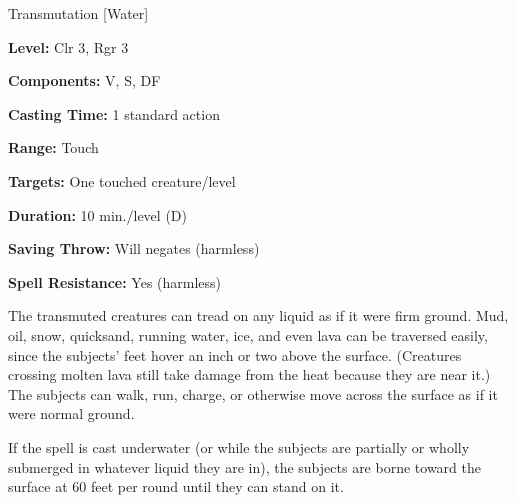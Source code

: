 
Transmutation [Water]

\textbf{Level:} Clr 3, Rgr 3

\textbf{Components:} V, S, DF

\textbf{Casting Time:} 1 standard action

\textbf{Range:} Touch

\textbf{Targets:} One touched creature/level

\textbf{Duration:} 10 min./level (D)

\textbf{Saving Throw:} Will negates (harmless)

\textbf{Spell Resistance:} Yes (harmless)

The transmuted creatures can tread on any liquid as if it were firm ground. Mud, 
oil, snow, quicksand, running water, ice, and even lava can be traversed easily, 
since the subjects' feet hover an inch or two above the surface. (Creatures crossing 
molten lava still take damage from the heat because they are near it.) The subjects 
can walk, run, charge, or otherwise move across the surface as if it were normal 
ground.

If the spell is cast underwater (or while the subjects are partially or wholly 
submerged in whatever liquid they are in), the subjects are borne toward the surface 
at 60 feet per round until they can stand on it.

